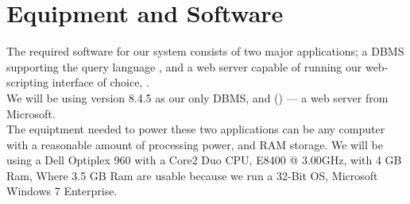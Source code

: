\section{Equipment and Software}
\label{sec:equipmentsoftware}

The required software for our system consists of two major applications; a DBMS supporting the query language \sql[], and a web server capable of running our web-scripting interface of choice, \aspnet[].\\
We will be using \posgresql[] version 8.4.5 as our only DBMS, and  \wholeiis[] (\iis[]) --- a web server from Microsoft.\\

The equiptment needed to power these two applications can be any computer with a reasonable amount of processing power, and RAM storage. We will be using a Dell Optiplex 960 with a Core2 Duo CPU, E8400 @ 3.00GHz, with 4 GB Ram, Where 3.5 GB Ram are usable because we run a 32-Bit OS, Microsoft Windows 7 Enterprise.